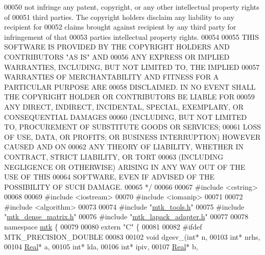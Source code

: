 \begin{DoxyCode}
00050 \textcolor{comment}{not infringe any patent, copyright, or any other intellectual property rights of}
00051 \textcolor{comment}{third parties. The copyright holders disclaim any liability to any recipient for}
00052 \textcolor{comment}{claims brought against recipient by any third party for infringement of that}
00053 \textcolor{comment}{parties intellectual property rights.}
00054 \textcolor{comment}{}
00055 \textcolor{comment}{THIS SOFTWARE IS PROVIDED BY THE COPYRIGHT HOLDERS AND CONTRIBUTORS "AS IS" AND}
00056 \textcolor{comment}{ANY EXPRESS OR IMPLIED WARRANTIES, INCLUDING, BUT NOT LIMITED TO, THE IMPLIED}
00057 \textcolor{comment}{WARRANTIES OF MERCHANTABILITY AND FITNESS FOR A PARTICULAR PURPOSE ARE}
00058 \textcolor{comment}{DISCLAIMED. IN NO EVENT SHALL THE COPYRIGHT HOLDER OR CONTRIBUTORS BE LIABLE FOR}
00059 \textcolor{comment}{ANY DIRECT, INDIRECT, INCIDENTAL, SPECIAL, EXEMPLARY, OR CONSEQUENTIAL DAMAGES}
00060 \textcolor{comment}{(INCLUDING, BUT NOT LIMITED TO, PROCUREMENT OF SUBSTITUTE GOODS OR SERVICES;}
00061 \textcolor{comment}{LOSS OF USE, DATA, OR PROFITS; OR BUSINESS INTERRUPTION) HOWEVER CAUSED AND ON}
00062 \textcolor{comment}{ANY THEORY OF LIABILITY, WHETHER IN CONTRACT, STRICT LIABILITY, OR TORT}
00063 \textcolor{comment}{(INCLUDING NEGLIGENCE OR OTHERWISE) ARISING IN ANY WAY OUT OF THE USE OF THIS}
00064 \textcolor{comment}{SOFTWARE, EVEN IF ADVISED OF THE POSSIBILITY OF SUCH DAMAGE.}
00065 \textcolor{comment}{*/}
00066 
00067 \textcolor{preprocessor}{#include <cstring>}
00068 
00069 \textcolor{preprocessor}{#include <iostream>}
00070 \textcolor{preprocessor}{#include <iomanip>}
00071 
00072 \textcolor{preprocessor}{#include <algorithm>}
00073 
00074 \textcolor{preprocessor}{#include "\hyperlink{mtk__tools_8h}{mtk\_tools.h}"}
00075 \textcolor{preprocessor}{#include "\hyperlink{mtk__dense__matrix_8h}{mtk\_dense\_matrix.h}"}
00076 \textcolor{preprocessor}{#include "\hyperlink{mtk__lapack__adapter_8h}{mtk\_lapack\_adapter.h}"}
00077 
00078 \textcolor{keyword}{namespace }\hyperlink{namespacemtk}{mtk} \{
00079 
00080 \textcolor{keyword}{extern} \textcolor{stringliteral}{"C"} \{
00081 
00082 \textcolor{preprocessor}{#ifdef MTK\_PRECISION\_DOUBLE}
00083 
00102 \textcolor{keywordtype}{void} dgesv\_(\textcolor{keywordtype}{int}* n,
00103             \textcolor{keywordtype}{int}* nrhs,
00104             \hyperlink{group__c01-roots_gac080bbbf5cbb5502c9f00405f894857d}{Real}* a,
00105             \textcolor{keywordtype}{int}* lda,
00106             \textcolor{keywordtype}{int}* ipiv,
00107             \hyperlink{group__c01-roots_gac080bbbf5cbb5502c9f00405f894857d}{Real}* b,

\end{DoxyCode}
